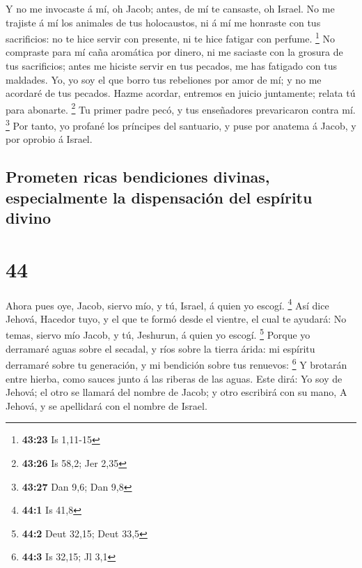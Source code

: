  Y no me invocaste á mí, oh Jacob; antes, de mí te
cansaste, oh Israel.  No me trajiste á mí los animales de
tus holocaustos, ni á mí me honraste con tus sacrificios: no te hice
servir con presente, ni te hice fatigar con perfume. \footnote{\textbf{43:23}
  Is 1,11-15}  No compraste para mí caña aromática por
dinero, ni me saciaste con la grosura de tus sacrificios; antes me
hiciste servir en tus pecados, me has fatigado con tus maldades.
 Yo, yo soy el que borro tus rebeliones por amor de mí; y
no me acordaré de tus pecados.  Hazme acordar, entremos
en juicio juntamente; relata tú para abonarte. \footnote{\textbf{43:26}
  Is 58,2; Jer 2,35}  Tu primer padre pecó, y tus
enseñadores prevaricaron contra mí. \footnote{\textbf{43:27} Dan 9,6;
  Dan 9,8}  Por tanto, yo profané los príncipes del
santuario, y puse por anatema á Jacob, y por oprobio á Israel.

\hypertarget{prometen-ricas-bendiciones-divinas-especialmente-la-dispensaciuxf3n-del-espuxedritu-divino}{%
\subsection{Prometen ricas bendiciones divinas, especialmente la
dispensación del espíritu
divino}\label{prometen-ricas-bendiciones-divinas-especialmente-la-dispensaciuxf3n-del-espuxedritu-divino}}

\hypertarget{section-43}{%
\section{44}\label{section-43}}

 Ahora pues oye, Jacob, siervo mío, y tú, Israel, á quien
yo escogí. \footnote{\textbf{44:1} Is 41,8}  Así dice
Jehová, Hacedor tuyo, y el que te formó desde el vientre, el cual te
ayudará: No temas, siervo mío Jacob, y tú, Jeshurun, á quien yo escogí.
\footnote{\textbf{44:2} Deut 32,15; Deut 33,5}  Porque yo
derramaré aguas sobre el secadal, y ríos sobre la tierra árida: mi
espíritu derramaré sobre tu generación, y mi bendición sobre tus
renuevos: \footnote{\textbf{44:3} Is 32,15; Jl 3,1}  Y
brotarán entre hierba, como sauces junto á las riberas de las aguas.
 Este dirá: Yo soy de Jehová; el otro se llamará del
nombre de Jacob; y otro escribirá con su mano, A Jehová, y se apellidará
con el nombre de Israel.


